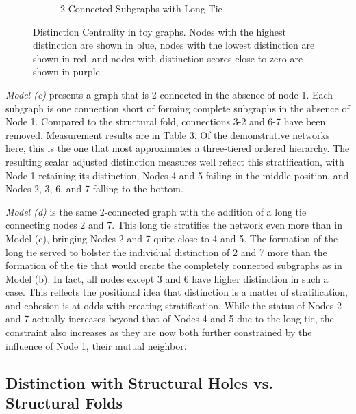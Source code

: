 \documentclass[12pt]{article}
\begin{document}
\begin{figure}
\begin{subfigure}[b]{0.45\textwidth}
            \caption{2-Connected Subgraphs with Long Tie}
            \label{fig:inter}
    \end{subfigure}
    \caption{Distinction Centrality in toy graphs. Nodes with the highest distinction are shown in blue, nodes with the lowest distinction are shown in red, and nodes with distinction scores close to zero are shown in purple.}
    \label{fig:toys}
\end{figure}






\textit{Model (c)} presents a graph that is 2-connected in the absence of node 1. Each subgraph is one connection short of forming complete subgraphs in the absence of Node 1. Compared to the structural fold, connections 3-2 and 6-7 have been removed. Measurement results are in Table 3. Of the demonstrative networks here, this is the one that most approximates a three-tiered ordered hierarchy. The resulting scalar adjusted distinction measures well reflect this stratification, with Node 1 retaining its distinction, Nodes 4 and 5 failing in the middle position, and Nodes 2, 3, 6, and 7 falling to the bottom. 

\textit{Model (d)} is the same 2-connected graph with the addition of a long tie connecting nodes 2 and 7. This long tie stratifies the network even more than in Model (c), bringing Nodes 2 and 7 quite close to 4 and 5. The formation of the long tie served to bolster the individual distinction of 2 and 7 more than the formation of the tie that would create the completely connected subgraphs as in Model (b). In fact, all nodes except 3 and 6 have higher distinction in such a case. This reflects the positional idea that distinction is a matter of stratification, and cohesion is at odds with creating stratification. While the status of Nodes 2 and 7 actually increases beyond that of Nodes 4 and 5 due to the long tie, the constraint also 
increases as they are now both further constrained by the influence of Node 1, their mutual neighbor.   

\subsection{Distinction with Structural Holes vs. Structural Folds}


\end{document}
